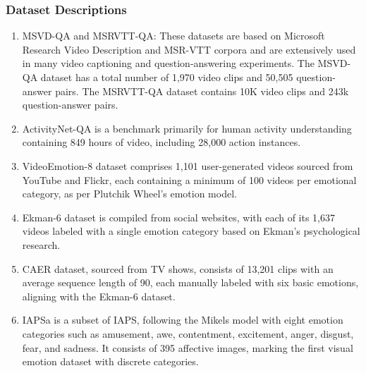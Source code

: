 \subsubsection{Dataset Descriptions}
\label{sec:Dataset Descriptions}
\begin{enumerate}
        \item MSVD-QA and MSRVTT-QA: These datasets are based on Microsoft Research Video Description \cite{chen2011collecting} and MSR-VTT corpora \cite{xu2016msr} and are extensively used in many video captioning and question-answering experiments. The MSVD-QA dataset has a total number of 1,970 video clips and 50,505 question-answer pairs. The MSRVTT-QA dataset contains 10K video clips and 243k question-answer pairs. 

        \item ActivityNet-QA \cite{caba2015activitynet} is a benchmark primarily for human activity understanding containing 849 hours of video, including 28,000 action instances.
        \item VideoEmotion-8 \cite{asur2010predicting} dataset comprises 1,101 user-generated videos sourced from YouTube and Flickr, each containing a minimum of 100 videos per emotional category, as per Plutchik Wheel's emotion model.
            
            \item Ekman-6 \cite{xu2016heterogeneous} dataset is compiled from social websites, with each of its 1,637 videos labeled with a single emotion category based on Ekman’s psychological research.
            
            \item CAER \cite{lee2019context} dataset, sourced from TV shows, consists of 13,201 clips with an average sequence length of 90, each manually labeled with six basic emotions, aligning with the Ekman-6 dataset. 

            \item IAPSa \cite{mikels2005emotional} is a subset of IAPS, following the Mikels model with eight emotion categories such as amusement, awe, contentment, excitement, anger, disgust, fear, and sadness. It consists of 395 affective images, marking the first visual emotion dataset with discrete categories.
            

\end{enumerate}

